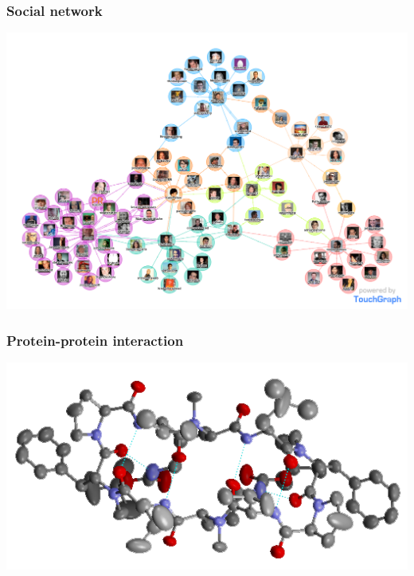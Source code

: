 \documentclass[compress]{beamer}
\begin{document}
\begin{frame}
  \frametitle{Social network}
  \begin{center}
    \includegraphics[scale=0.2]{social.png}
  \end{center}
\end{frame}

\begin{frame}
  \frametitle{Protein-protein interaction}
  \begin{center}
    \includegraphics[scale=0.5]{ppi.png}
  \end{center}
\end{frame}
\end{document}
